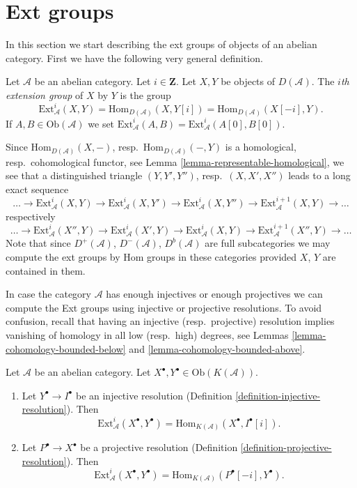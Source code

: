 \section{Ext groups}
\label{section-ext}

\noindent
In this section we start describing the ext groups of objects
of an abelian category. First we have the following very general
definition.

\begin{definition}
\label{definition-ext}
Let $\mathcal{A}$ be an abelian category. Let $i \in \mathbf{Z}$. Let
$X, Y$ be objects of $D(\mathcal{A})$. The {\it $i$th extension group}
of $X$ by $Y$ is the group
$$
\text{Ext}^i_\mathcal{A}(X, Y) =
\text{Hom}_{D(\mathcal{A})}(X, Y[i]) =
\text{Hom}_{D(\mathcal{A})}(X[-i], Y).
$$
If $A, B \in \text{Ob}(\mathcal{A})$ we set
$\text{Ext}^i_\mathcal{A}(A, B) = \text{Ext}^i_\mathcal{A}(A[0], B[0])$.
\end{definition}

\noindent
Since $\text{Hom}_{D(\mathcal{A})}(X, -)$,
resp.\ $\text{Hom}_{D(\mathcal{A})}(-, Y)$ is a homological,
resp.\ cohomological functor, see
Lemma \ref{lemma-representable-homological},
we see that a distinguished triangle $(Y, Y', Y'')$,
resp.\ $(X, X', X'')$ leads to a long exact sequence
$$
\ldots \to
\text{Ext}^i_\mathcal{A}(X, Y) \to
\text{Ext}^i_\mathcal{A}(X, Y') \to
\text{Ext}^i_\mathcal{A}(X, Y'') \to
\text{Ext}^{i + 1}_\mathcal{A}(X, Y) \to \ldots
$$
respectively
$$
\ldots \to
\text{Ext}^i_\mathcal{A}(X'', Y) \to
\text{Ext}^i_\mathcal{A}(X', Y) \to
\text{Ext}^i_\mathcal{A}(X, Y) \to
\text{Ext}^{i + 1}_\mathcal{A}(X'', Y) \to \ldots
$$
Note that since $D^+(\mathcal{A})$, $D^-(\mathcal{A})$, $D^b(\mathcal{A})$
are full subcategories we may compute the ext groups by Hom groups
in these categories provided $X$, $Y$ are contained in them.

\noindent
In case the category $\mathcal{A}$ has enough injectives or enough
projectives we can compute the Ext groups using injective or
projective resolutions. To avoid confusion, recall that having an
injective (resp.\ projective) resolution implies vanishing of homology
in all low (resp.\ high) degrees, see
Lemmas \ref{lemma-cohomology-bounded-below} and
\ref{lemma-cohomology-bounded-above}.

\begin{lemma}
\label{lemma-compute-ext-resolutions}
Let $\mathcal{A}$ be an abelian category.
Let $X^\bullet, Y^\bullet \in \text{Ob}(K(\mathcal{A}))$.
\begin{enumerate}
\item Let $Y^\bullet \to I^\bullet$ be an injective resolution
(Definition \ref{definition-injective-resolution}). Then
$$
\text{Ext}^i_\mathcal{A}(X^\bullet, Y^\bullet) =
\text{Hom}_{K(\mathcal{A})}(X^\bullet, I^\bullet[i]).
$$
\item Let $P^\bullet \to X^\bullet$ be a projective resolution
(Definition \ref{definition-projective-resolution}). Then
$$
\text{Ext}^i_\mathcal{A}(X^\bullet, Y^\bullet) =
\text{Hom}_{K(\mathcal{A})}(P^\bullet[-i], Y^\bullet).
$$
\end{enumerate}
\end{lemma}

